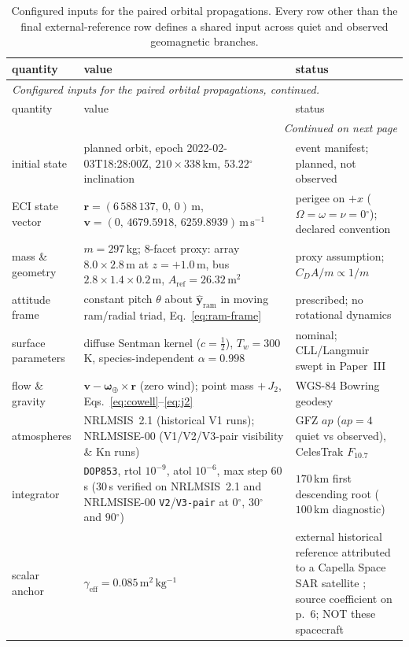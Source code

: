 \documentclass[12pt]{article}
\newcommand{\unit}[1]{\,\mathrm{#1}}
\newcommand{\degree}{\ensuremath{{}^\circ}}
\begin{document}
{\small
\begin{longtable}{p{3.1cm}p{5.4cm}p{5.1cm}}
\caption{Configured inputs for the paired orbital propagations. Every row other than the final external-reference row defines a shared input across quiet and observed geomagnetic branches.}
\label{tab:setup} \\
\toprule
quantity & value & status \\
\midrule
\endfirsthead
\multicolumn{3}{l}{\emph{Configured inputs for the paired orbital propagations, continued.}} \\
\toprule
quantity & value & status \\
\midrule
\endhead
\midrule
\multicolumn{3}{r}{\emph{Continued on next page}} \\
\endfoot
\bottomrule
\endlastfoot
initial state & planned orbit, epoch 2022-02-03T18:28:00Z,
  $210\times338\,$km, $53.22\degree$ inclination & event manifest; planned, not
  observed \\
ECI state vector & $\mathbf{r}=(6\,588\,137,\,0,\,0)\unit{m}$,
  $\mathbf{v}=(0,\,4679.5918,\,6259.8939)\unit{m\,s^{-1}}$ &
  perigee on $+x$ ($\Omega=\omega=\nu=0\degree$); declared convention \\
mass \& geometry & $m=297\,$kg; 8-facet proxy: array $8.0\times2.8\,$m at $z=+1.0\,$m, bus
  $2.8\times1.4\times0.2\,$m, $A_{\mathrm{ref}}=26.32\,\mathrm{m^2}$ & proxy assumption; $C_D A/m \propto 1/m$ \\
attitude frame & constant pitch $\theta$ about $\hat{\mathbf{y}}_{\mathrm{ram}}$ in moving ram/radial triad, Eq.~\eqref{eq:ram-frame} & prescribed; no rotational dynamics \\
surface parameters & diffuse Sentman kernel ($c=\tfrac12$), $T_w=300\,$K, species-independent $\alpha=0.998$ & nominal; CLL/Langmuir swept in Paper~III \\
flow \& gravity & $\mathbf{v}-\boldsymbol{\omega}_\oplus\times\mathbf{r}$ (zero wind); point mass $+\,J_2$, Eqs.~\eqref{eq:cowell}--\eqref{eq:j2} & WGS-84 Bowring geodesy \\
atmospheres & NRLMSIS~2.1 (historical V1 runs); NRLMSISE-00 (V1/V2/V3-pair visibility \& $\mathrm{Kn}$ runs) & GFZ $ap$ ($ap=4$ quiet vs observed), CelesTrak $F_{10.7}$ \\
integrator & \texttt{DOP853}, rtol $10^{-9}$, atol $10^{-6}$, max step $60\,$s ($30\,$s verified on NRLMSIS~2.1 and NRLMSISE-00 \texttt{V2}/\texttt{V3-pair} at $0\degree$, $30\degree$ and $90\degree$) & $170\,$km first descending root ($100\,$km diagnostic) \\
scalar anchor & $\gamma_{\mathrm{eff}}=0.085\,\mathrm{m^2\,kg^{-1}}$ & external
  historical reference attributed to a Capella Space SAR satellite \citep{shambaugh2024}; source coefficient on p.~6; NOT these spacecraft \\
\end{longtable}
}
\end{document}
